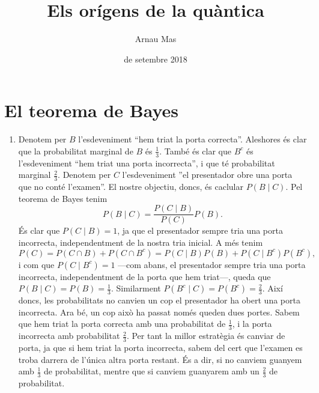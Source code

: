 \documentclass[12pt]{article}
\title{\sffamily {\bfseries Entrega 1:} Els orígens de la quàntica}
\author{\sffamily Arnau Mas}
\date{\sffamily 25 de setembre 2018}
\numberwithin{table}{section}
\numberwithin{figure}{section}
\numberwithin{equation}{section}
\begin{document}
\maketitle

\section{El teorema de Bayes}
\begin{enumerate}[label=(\alph*), font=\bfseries \sffamily, wide, labelwidth=!, labelindent=0pt]
	\item Denotem per \( B \) l'esdeveniment ``hem triat la porta correcta''. Aleshores és clar que la probabilitat marginal de \( B \) és \( \frac{1}{3} \). També és clar que \( B^c \) és l'esdeveniment ``hem triat una porta incorrecta'', i que té probabilitat marginal \( \frac{2}{3} \). Denotem per \( C \) l'esdeveniment ''el presentador obre una porta que no conté l'examen''. El nostre objectiu, doncs, és caclular \( P(B \mid C) \). Pel teorema de Bayes tenim
		\begin{equation*}
			P(B \mid C) = \frac{P(C \mid B)}{P(C)} P(B).
		\end{equation*}
		És clar que \( P(C \mid B) = 1 \), ja que el presentador sempre tria una porta incorrecta, independentment de la nostra tria inicial. A més tenim 
		\begin{equation*}
			P(C) = P(C \cap B) + P(C \cap B^c) = P(C \mid B)P(B) + P(C \mid B^c)P(B^c),
		\end{equation*}
		i com que \( P(C \mid B^c) = 1 \) ---com abans, el presentador sempre tria una porta incorrecta, independentment de la porta que hem triat---, queda que \( P(B \mid C) = P(B) = \frac{1}{3} \). Similarment \( P(B^c \mid C) = P(B^c) = \frac{2}{3} \). Així doncs, les probabilitats no canvien un cop el presentador ha obert una porta incorrecta. Ara bé, un cop això ha passat només queden dues portes. Sabem que hem triat la porta correcta amb una probabilitat de \( \frac{1}{3} \), i la porta incorrecta amb probabilitat \( \frac{2}{3} \). Per tant la millor estratègia és canviar de porta, ja que si hem triat la porta incorrecta, sabem del cert que l'examen es troba darrera de l'única altra porta restant. És a dir, si no canviem guanyem amb \( \frac{1}{3} \) de probabilitat, mentre que si canviem guanyarem amb un \( \frac{2}{3} \) de probabilitat.  


\end{enumerate}
\end{document}

